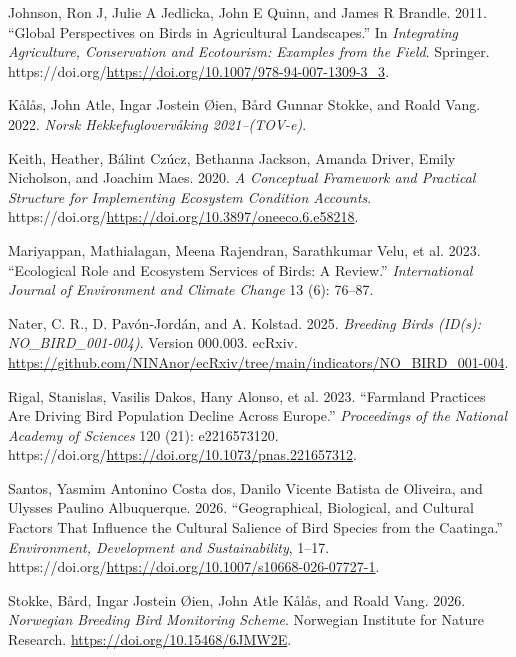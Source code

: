 \documentclass[
  letterpaper,
  DIV=11,
  numbers=noendperiod]{scrartcl}
\newlength{\cslhangindent}
\newenvironment{CSLReferences}[2] %
 {\begin{list}{}{%
  \setlength{\itemindent}{0pt}
  \setlength{\leftmargin}{0pt}
  \setlength{\parsep}{0pt}
  \ifodd #1
   \setlength{\leftmargin}{\cslhangindent}
   \setlength{\itemindent}{-1\cslhangindent}
  \fi
  \setlength{\itemsep}{#2\baselineskip}}}
 {\end{list}}
\begin{document}
\begin{CSLReferences}{1}{1}
Johnson, Ron J, Julie A Jedlicka, John E Quinn, and James R Brandle.
2011. {``Global Perspectives on Birds in Agricultural Landscapes.''} In
\emph{Integrating Agriculture, Conservation and Ecotourism: Examples
from the Field}. Springer.
https://doi.org/\url{https://doi.org/10.1007/978-94-007-1309-3_3}.

Kålås, John Atle, Ingar Jostein Øien, Bård Gunnar Stokke, and Roald
Vang. 2022. \emph{Norsk Hekkefugloverv{å}king 2021--(TOV-e)}.

Keith, Heather, Bálint Czúcz, Bethanna Jackson, Amanda Driver, Emily
Nicholson, and Joachim Maes. 2020. \emph{A Conceptual Framework and
Practical Structure for Implementing Ecosystem Condition Accounts}.
https://doi.org/\url{https://doi.org/10.3897/oneeco.6.e58218}.

Mariyappan, Mathialagan, Meena Rajendran, Sarathkumar Velu, et al. 2023.
{``Ecological Role and Ecosystem Services of Birds: A Review.''}
\emph{International Journal of Environment and Climate Change} 13 (6):
76--87.

Nater, C. R., D. Pavón-Jordán, and A. Kolstad. 2025. \emph{Breeding
Birds (ID(s): NO\_BIRD\_001-004)}. Version 000.003. ecRxiv.
\url{https://github.com/NINAnor/ecRxiv/tree/main/indicators/NO_BIRD_001-004}.

{Rigal, Stanislas, Vasilis Dakos, Hany Alonso, et al.} 2023. {``Farmland
Practices Are Driving Bird Population Decline Across Europe.''}
\emph{Proceedings of the National Academy of Sciences} 120 (21):
e2216573120.
https://doi.org/\url{https://doi.org/10.1073/pnas.221657312}.

Santos, Yasmim Antonino Costa dos, Danilo Vicente Batista de Oliveira,
and Ulysses Paulino Albuquerque. 2026. {``Geographical, Biological, and
Cultural Factors That Influence the Cultural Salience of Bird Species
from the Caatinga.''} \emph{Environment, Development and
Sustainability}, 1--17.
https://doi.org/\url{https://doi.org/10.1007/s10668-026-07727-1}.

Stokke, Bård, Ingar Jostein Øien, John Atle Kålås, and Roald Vang. 2026.
\emph{Norwegian Breeding Bird Monitoring Scheme}. Norwegian Institute
for Nature Research. \url{https://doi.org/10.15468/6JMW2E}.


\end{CSLReferences}
\end{document}
